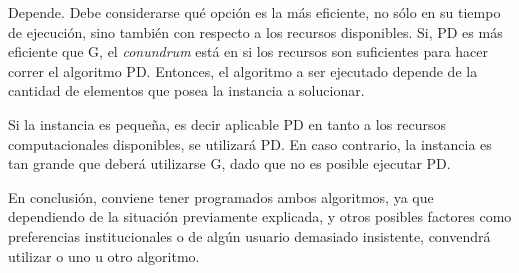 \documentclass[../tp2_grupo404.tex]{subfiles}
\begin{document}
Depende. Debe considerarse qué opción es la más eficiente, no sólo
en su tiempo de ejecución, sino también con respecto a los recursos
disponibles. Si, PD es más eficiente que G, el \emph{conundrum} está
en si los recursos son suficientes para hacer correr el algoritmo PD.
Entonces, el algoritmo a ser ejecutado depende de la cantidad de
elementos que posea la instancia a solucionar.

Si la instancia es pequeña, es decir aplicable PD en tanto a los
recursos computacionales disponibles, se utilizará PD. En caso
contrario, la instancia es tan grande que deberá utilizarse G, dado
que no es posible ejecutar PD.

En conclusión, conviene tener programados ambos algoritmos, ya que
dependiendo de la situación previamente explicada, y otros posibles
factores como preferencias institucionales o de algún usuario demasiado
insistente, convendrá utilizar o uno u otro algoritmo.

\end{document}
